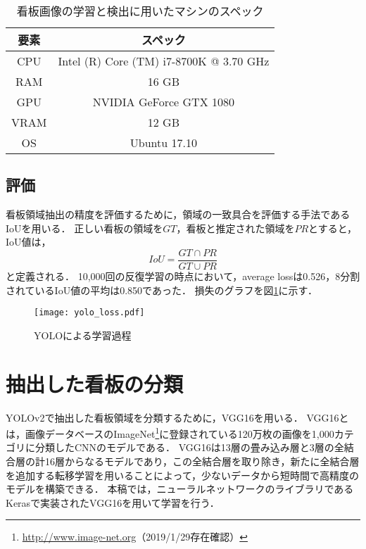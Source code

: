     \begin{table}[tb]
      \caption{看板画像の学習と検出に用いたマシンのスペック}
      \label{table:machine}
      \begin{center}
        \begin{tabular}{c|c}
          \hline
          \textbf{要素} & \textbf{スペック} \\
          \hline
          CPU & Intel (R) Core (TM) i7-8700K @ 3.70 GHz \\
          RAM & 16 GB \\
          GPU & NVIDIA GeForce GTX 1080 \\
          VRAM & 12 GB \\
          OS & Ubuntu 17.10 \\
          \hline
        \end{tabular}
      \end{center}
    \end{table}

  \subsection{評価}
    看板領域抽出の精度を評価するために，領域の一致具合を評価する手法であるIoUを用いる．
    正しい看板の領域を$GT$，看板と推定された領域を$PR$とすると，IoU値は，
    \begin{equation}
      IoU = \frac{GT \cap PR}{GT \cup PR}
    \end{equation}
    と定義される．
    10,000回の反復学習の時点において，average lossは0.526，8分割されているIoU値の平均は0.850であった．
    損失のグラフを図\ref{figure:yolo_loss}に示す．

    \begin{figure}[tb]
      \centerline{\texttt{[image: yolo\_loss.pdf]}}
      \caption{YOLOによる学習過程}
      \label{figure:yolo_loss}
    \end{figure}

\section{抽出した看板の分類}
  YOLOv2で抽出した看板領域を分類するために，VGG16を用いる．
  VGG16とは，画像データベースのImageNet\footnote{\url{http://www.image-net.org}（2019/1/29存在確認）}に登録されている120万枚の画像を1,000カテゴリに分類したCNNのモデルである．
  VGG16は13層の畳み込み層と3層の全結合層の計16層からなるモデルであり，この全結合層を取り除き，新たに全結合層を追加する転移学習を用いることによって，少ないデータから短時間で高精度のモデルを構築できる．
  本稿では，ニューラルネットワークのライブラリであるKeras\cite{Chollet:2015}で実装されたVGG16を用いて学習を行う．

